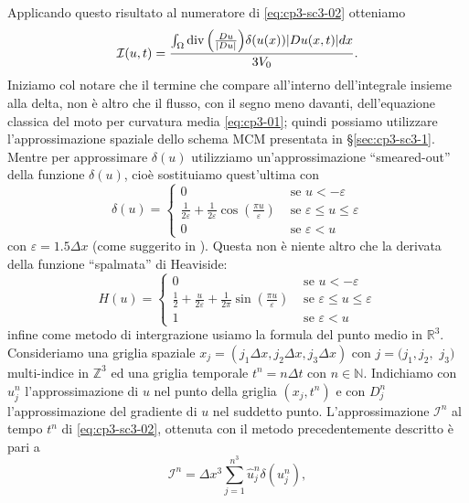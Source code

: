 Applicando questo risultato al numeratore di \eqref{eq:cp3-sc3-02}
otteniamo
\begin{equation}
  \label{eq:cp3-sc3-07}
\mathcal{I}(u,t) = \frac{\int_{\Omega}\operatorname{div}{\left(\frac{Du}{|Du|}\right)}\delta(u(x))|Du(x,t)|dx}{3V_0}.
\end{equation}
Iniziamo col notare che il termine che compare all'interno
dell'integrale insieme alla delta, non è altro che il flusso, con il
segno meno davanti, dell'equazione classica del moto per curvatura
media \eqref{eq:cp3-01}; quindi possiamo utilizzare l'approssimazione
spaziale dello schema MCM presentata in §\ref{sec:cp3-sc3-1}. Mentre
per approssimare $\delta(u)$ utilizziamo un'approssimazione
``smeared-out'' della funzione $\delta(u)$, cioè sostituiamo
quest'ultima con
\begin{equation}
  \label{eq:cp3-sc3-08}
  \delta(u)=
  \begin{cases}
    0 &\text{ se $u<-\varepsilon$} \\
    \frac{1}{2\varepsilon}+\frac{1}{2\varepsilon}\cos\left(\frac{\pi
      u}{\varepsilon}\right) &\text{ se $\varepsilon\leq u \leq\varepsilon$} \\
    0 &\text{ se $\varepsilon<u$}
  \end{cases}
\end{equation}
con $\varepsilon=1.5\Delta x$ (come suggerito in
\cite[][§1.5]{osher:fed}). Questa non è niente altro che la derivata
della funzione ``spalmata'' di Heaviside:
\[
H(u)=
\begin{cases}
 0 &\text{ se $u<-\varepsilon$} \\
    \frac{1}{2}+\frac{u}{2\varepsilon} +\frac{1}{2\pi}\sin\left(\frac{\pi
      u}{\varepsilon}\right) &\text{ se $\varepsilon\leq u \leq\varepsilon$} \\
 1 &\text{ se $\varepsilon<u$} 
\end{cases}
\]
infine come metodo di intergrazione usiamo la formula del punto medio
in $\mathbb{R}^3$. 
Consideriamo una griglia spaziale $x_j=(j_1\Delta x,j_2\Delta
x,j_3\Delta x)$ con $j=(j_1,j_2,$ $j_3)$ multi-indice in $\mathbb{Z}^3$ ed una griglia temporale $t^n=n\Delta t$ con $n\in\mathbb{N}$.
Indichiamo con $u_j^n$ l'approssimazione di $u$ nel punto della
griglia $(x_j,t^n)$ e con $D_j^n$ l'approssimazione del gradiente di
$u$ nel suddetto punto. L'approssimazione $\mathcal{I}^n$ al
tempo $t^n$ di  \eqref{eq:cp3-sc3-02}, ottenuta con il metodo precedentemente
descritto è pari a 
\begin{equation}
\label{eq:cp3-sc3-08-add}
\mathcal{I}^n=\Delta x^3\sum_{j=1}^{n^3}\hat{u}_j^n\delta(u_j^n),
\end{equation}
